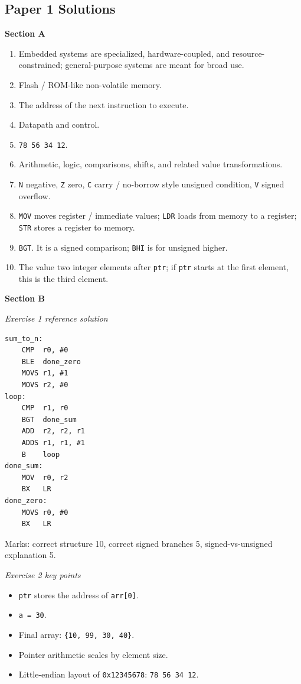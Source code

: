 \documentclass[11pt,a4paper]{article}
\begin{document}
\subsection*{Paper 1 Solutions}
\textbf{Section A}
\begin{enumerate}
\item Embedded systems are specialized, hardware-coupled, and resource-constrained; general-purpose systems are meant for broad use.
\item Flash / ROM-like non-volatile memory.
\item The address of the next instruction to execute.
\item Datapath and control.
\item \texttt{78 56 34 12}.
\item Arithmetic, logic, comparisons, shifts, and related value transformations.
\item \texttt{N} negative, \texttt{Z} zero, \texttt{C} carry / no-borrow style unsigned condition, \texttt{V} signed overflow.
\item \texttt{MOV} moves register / immediate values; \texttt{LDR} loads from memory to a register; \texttt{STR} stores a register to memory.
\item \texttt{BGT}. It is a signed comparison; \texttt{BHI} is for unsigned higher.
\item The value two integer elements after \texttt{ptr}; if \texttt{ptr} starts at the first element, this is the third element.
\end{enumerate}

\textbf{Section B}

\textit{Exercise 1 reference solution}
\begin{verbatim}
sum_to_n:
    CMP  r0, #0
    BLE  done_zero
    MOVS r1, #1
    MOVS r2, #0
loop:
    CMP  r1, r0
    BGT  done_sum
    ADD  r2, r2, r1
    ADDS r1, r1, #1
    B    loop
done_sum:
    MOV  r0, r2
    BX   LR
done_zero:
    MOVS r0, #0
    BX   LR
\end{verbatim}
Marks: correct structure 10, correct signed branches 5, signed-vs-unsigned explanation 5.

\textit{Exercise 2 key points}
\begin{itemize}[leftmargin=1.5em]
\item \texttt{ptr} stores the address of \texttt{arr[0]}.
\item \texttt{a = 30}.
\item Final array: \texttt{\{10, 99, 30, 40\}}.
\item Pointer arithmetic scales by element size.
\item Little-endian layout of \texttt{0x12345678}: \texttt{78 56 34 12}.
\end{itemize}
\end{document}
